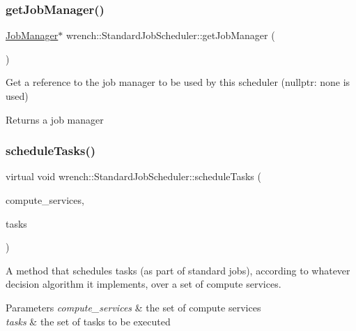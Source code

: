 \subsubsection{\texorpdfstring{get\+Job\+Manager()}{getJobManager()}}
{\footnotesize\ttfamily \hyperlink{classwrench_1_1_job_manager}{Job\+Manager}$\ast$ wrench\+::\+Standard\+Job\+Scheduler\+::get\+Job\+Manager (\begin{DoxyParamCaption}{ }\end{DoxyParamCaption})\hspace{0.3cm}{\ttfamily [inline]}}



Get a reference to the job manager to be used by this scheduler (nullptr\+: none is used) 

\begin{DoxyReturn}{Returns}
a job manager 
\end{DoxyReturn}
\mbox{\label{classwrench_1_1_standard_job_scheduler_a1ef07acfece4706f7f172c740a8015c3}} 
\subsubsection{\texorpdfstring{schedule\+Tasks()}{scheduleTasks()}}
{\footnotesize\ttfamily virtual void wrench\+::\+Standard\+Job\+Scheduler\+::schedule\+Tasks (\begin{DoxyParamCaption}\item[{const std\+::set$<$ \hyperlink{classwrench_1_1_compute_service}{Compute\+Service} $\ast$$>$ \&}]{compute\+\_\+services,  }\item[{const std\+::vector$<$ \hyperlink{classwrench_1_1_workflow_task}{Workflow\+Task} $\ast$$>$ \&}]{tasks }\end{DoxyParamCaption})\hspace{0.3cm}{\ttfamily [pure virtual]}}



A method that schedules tasks (as part of standard jobs), according to whatever decision algorithm it implements, over a set of compute services. 


\begin{DoxyParams}{Parameters}
{\em compute\+\_\+services} & the set of compute services \\
\hline
{\em tasks} & the set of tasks to be executed \\
\hline
\end{DoxyParams}
\mbox{\label{classwrench_1_1_standard_job_scheduler_a339858962279af4563461f872b4ea7d4}} 
